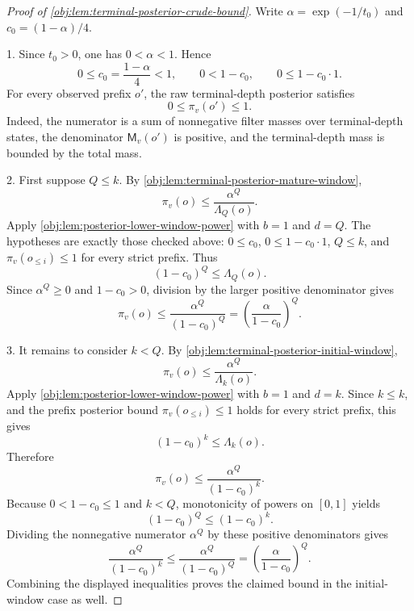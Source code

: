 \documentclass[11pt]{article}
\begin{document}
\begin{proof}[Proof of \cref{obj:lem:terminal-posterior-crude-bound}]
Write \(\alpha=\exp(-1/t_0)\) and \(c_0=(1-\alpha)/4\).

1. Since \(t_0>0\), one has \(0<\alpha<1\). Hence
\[
0\le c_0=\frac{1-\alpha}{4}<1,
\qquad
0<1-c_0,
\qquad
0\le 1-c_0\cdot 1 .
\]
For every observed prefix \(o'\), the raw terminal-depth posterior satisfies
\[
0\le \pi_v(o')\le 1.
\]
Indeed, the numerator is a sum of nonnegative filter masses over terminal-depth states, the denominator \(\mathsf M_v(o')\) is positive, and the terminal-depth mass is bounded by the total mass. %

2. First suppose \(Q\le k\). By \cref{obj:lem:terminal-posterior-mature-window},
\[
\pi_v(o)\le \frac{\alpha^Q}{\Lambda_Q(o)} .
\]
Apply \cref{obj:lem:posterior-lower-window-power} with \(b=1\) and \(d=Q\). The hypotheses are exactly those checked above: \(0\le c_0\), \(0\le 1-c_0\cdot 1\), \(Q\le k\), and \(\pi_v(o_{\le i})\le 1\) for every strict prefix. Thus
\[
(1-c_0)^Q\le \Lambda_Q(o).
\]
Since \(\alpha^Q\ge 0\) and \(1-c_0>0\), division by the larger positive denominator gives
\[
\pi_v(o)
\le
\frac{\alpha^Q}{(1-c_0)^Q}
=
\left(\frac{\alpha}{1-c_0}\right)^Q .
\]

3. It remains to consider \(k<Q\). By \cref{obj:lem:terminal-posterior-initial-window},
\[
\pi_v(o)\le \frac{\alpha^Q}{\Lambda_k(o)} .
\]
Apply \cref{obj:lem:posterior-lower-window-power} with \(b=1\) and \(d=k\). Since \(k\le k\), and the prefix posterior bound \(\pi_v(o_{\le i})\le 1\) holds for every strict prefix, this gives
\[
(1-c_0)^k\le \Lambda_k(o).
\]
Therefore
\[
\pi_v(o)
\le
\frac{\alpha^Q}{(1-c_0)^k}.
\]
Because \(0<1-c_0\le 1\) and \(k<Q\), monotonicity of powers on \([0,1]\) yields
\[
(1-c_0)^Q\le (1-c_0)^k .
\]
Dividing the nonnegative numerator \(\alpha^Q\) by these positive denominators gives
\[
\frac{\alpha^Q}{(1-c_0)^k}
\le
\frac{\alpha^Q}{(1-c_0)^Q}
=
\left(\frac{\alpha}{1-c_0}\right)^Q .
\]
Combining the displayed inequalities proves the claimed bound in the initial-window case as well. %
\end{proof}
\end{document}
